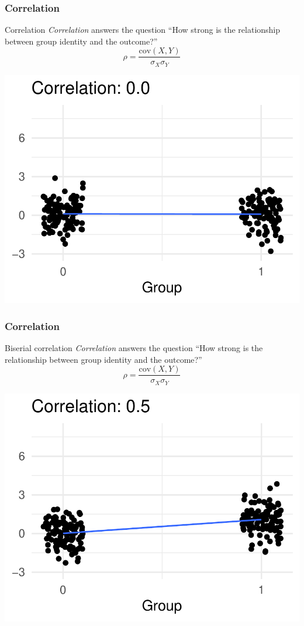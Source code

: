 \documentclass[12pt, block=fill]{beamer}
\newcommand{\cov}{\text{cov}}
\begin{document}
\begin{frame}
  \frametitle{Correlation}
  \begin{block}{Correlation}
    \textit{Correlation} answers the question ``How strong is the
    relationship between group identity and the outcome?''
    \[
      \rho = \frac{\cov(X, Y)}{\sigma_{X}\sigma_{Y}}
    \]
  \end{block}

  \begin{center}
    \includegraphics[width = 0.5\linewidth]{./figures/biserial_00}
  \end{center}
\end{frame}

\begin{frame}
  \frametitle{Correlation}

  \begin{block}{Biserial correlation}
    \textit{Correlation} answers the question ``How strong
    is the relationship between group identity and the outcome?''
    \[
      \rho = \frac{\cov(X, Y)}{\sigma_{X}\sigma_{Y}}
    \]
  \end{block}

  \begin{center}
    \includegraphics[width = 0.4\linewidth]{./figures/biserial_05}
  \end{center}
\end{frame}
\end{document}
